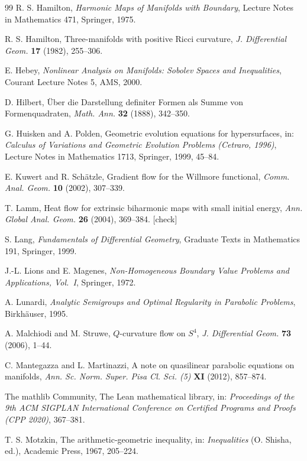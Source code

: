\documentclass[11pt,reqno]{amsart}
\theoremstyle{definition}
\theoremstyle{remark}
\newcommand{\todo}[1]{\textcolor{red!70!black}{[#1]}}
\numberwithin{equation}{section}
\begin{document}
\begin{thebibliography}{99}
 R. S. Hamilton, \emph{Harmonic Maps of Manifolds with Boundary}, Lecture Notes in
Mathematics 471, Springer, 1975.

 R. S. Hamilton, Three-manifolds with positive Ricci curvature, \emph{J.
Differential Geom.} \textbf{17} (1982), 255--306.

 E. Hebey, \emph{Nonlinear Analysis on Manifolds: Sobolev Spaces and Inequalities},
Courant Lecture Notes 5, AMS, 2000.

 D. Hilbert, \"Uber die Darstellung definiter Formen als Summe von Formenquadraten,
\emph{Math. Ann.} \textbf{32} (1888), 342--350.

 G. Huisken and A. Polden, Geometric evolution equations for hypersurfaces, in:
\emph{Calculus of Variations and Geometric Evolution Problems (Cetraro, 1996)}, Lecture Notes in
Mathematics 1713, Springer, 1999, 45--84.

 E. Kuwert and R. Sch\"atzle, Gradient flow for the Willmore functional,
\emph{Comm. Anal. Geom.} \textbf{10} (2002), 307--339.

 T. Lamm, Heat flow for extrinsic biharmonic maps with small initial energy, \emph{Ann.
Global Anal. Geom.} \textbf{26} (2004), 369--384. \todo{check}

 S. Lang, \emph{Fundamentals of Differential Geometry}, Graduate Texts in Mathematics
191, Springer, 1999.

 J.-L. Lions and E. Magenes, \emph{Non-Homogeneous Boundary Value Problems and
Applications, Vol.~I}, Springer, 1972.

 A. Lunardi, \emph{Analytic Semigroups and Optimal Regularity in Parabolic Problems},
Birkh\"auser, 1995.

 A. Malchiodi and M. Struwe, $Q$-curvature flow on $S^4$, \emph{J.
Differential Geom.} \textbf{73} (2006), 1--44.

 C. Mantegazza and L. Martinazzi, A note on quasilinear parabolic equations on manifolds,
\emph{Ann. Sc. Norm. Super. Pisa Cl. Sci. (5)} \textbf{XI} (2012), 857--874.

 The mathlib Community, The Lean mathematical library, in: \emph{Proceedings of the
9th ACM SIGPLAN International Conference on Certified Programs and Proofs (CPP 2020)}, 367--381.

 T. S. Motzkin, The arithmetic-geometric inequality, in: \emph{Inequalities}
(O. Shisha, ed.), Academic Press, 1967, 205--224.


\end{thebibliography}
\end{document}
